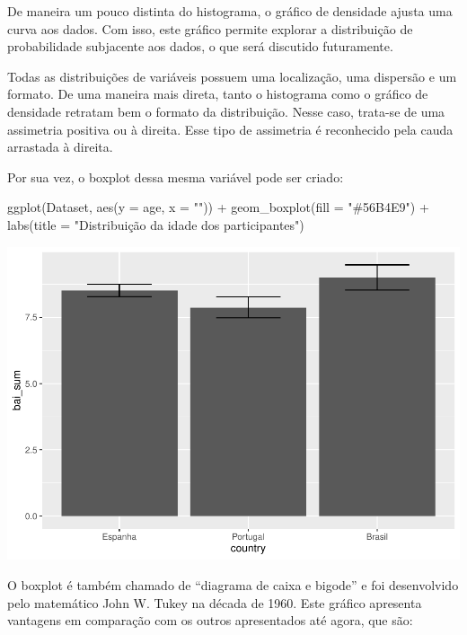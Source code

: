 \documentclass[
]{book}
\newenvironment{Shaded}{\begin{snugshade}}{\end{snugshade}}
\newcommand{\AttributeTok}[1]{\textcolor[rgb]{0.77,0.63,0.00}{#1}}
\newcommand{\FunctionTok}[1]{\textcolor[rgb]{0.00,0.00,0.00}{#1}}
\newcommand{\NormalTok}[1]{#1}
\newcommand{\SpecialCharTok}[1]{\textcolor[rgb]{0.00,0.00,0.00}{#1}}
\newcommand{\StringTok}[1]{\textcolor[rgb]{0.31,0.60,0.02}{#1}}
\begin{document}
De maneira um pouco distinta do histograma, o gráfico de densidade ajusta uma curva aos dados. Com isso, este gráfico permite explorar a distribuição de probabilidade subjacente aos dados, o que será discutido futuramente.

Todas as distribuições de variáveis possuem uma localização, uma dispersão e um formato. De uma maneira mais direta, tanto o histograma como o gráfico de densidade retratam bem o formato da distribuição. Nesse caso, trata-se de uma assimetria positiva ou à direita. Esse tipo de assimetria é reconhecido pela cauda arrastada à direita.

Por sua vez, o boxplot dessa mesma variável pode ser criado:

\begin{Shaded}
\begin{Highlighting}[]
\FunctionTok{ggplot}\NormalTok{(Dataset, }\FunctionTok{aes}\NormalTok{(}\AttributeTok{y =}\NormalTok{ age, }\AttributeTok{x =} \StringTok{""}\NormalTok{)) }\SpecialCharTok{+}
  \FunctionTok{geom\_boxplot}\NormalTok{(}\AttributeTok{fill =} \StringTok{"\#56B4E9"}\NormalTok{) }\SpecialCharTok{+}
  \FunctionTok{labs}\NormalTok{(}\AttributeTok{title =} \StringTok{"Distribuição da idade dos participantes"}\NormalTok{)}
\end{Highlighting}
\end{Shaded}

\begin{center}\includegraphics{gitbook-demo_files/figure-latex/unnamed-chunk-20-1} \end{center}

O boxplot é também chamado de ``diagrama de caixa e bigode'' e foi desenvolvido pelo matemático John W. Tukey na década de 1960. Este gráfico apresenta vantagens em comparação com os outros apresentados até agora, que são:
\end{document}
